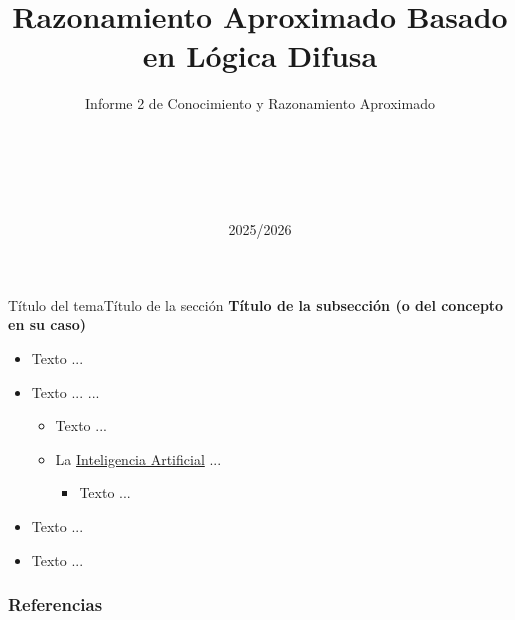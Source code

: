 \documentclass[10pt, envcountsect, presentation, aspectratio=169]{beamer}
\title[Nombre]{Razonamiento Aproximado Basado en Lógica Difusa}
\subtitle{Informe 2 de Conocimiento y Razonamiento Aproximado} %
\author[E1. Apellidos1, E2. Apellidos2] %
{%
	\sc{Estudiante1 Apellidos1}\\  %
	\\
	\sc{Estudiante2 Apellidos 2}\\ %
	\\   %
}
\institute[DIIC]%
{
	\textit{Universidad de Murcia}
}
\date{2025/2026} %
\begin{document}
	



\begin{frame}[plain]
	\titlepage
\end{frame}



\begin{frame}{Título del tema}{Título de la sección}
\textbf{Título de la subsección (o del concepto en su caso)}
	\begin{itemize}
	\item Texto ...
	\item Texto ... \citep{Russell2020} ...
		\begin{itemize}
		\normalsize %
		\item[--] Texto ...
		\item[--] La \href{https://es.wikipedia.org/wiki/Inteligencia_artificial}{Inteligencia Artificial} ...
			\begin{itemize}
			\normalsize %
			\item[$\bullet$] Texto ...
			\end{itemize}	
			\end{itemize} 
	\item Texto ...		
	\item Texto ...
	\end{itemize}
\end{frame}





\begin{frame} %
	\frametitle{Referencias}
	\footnotesize
	
		
\end{frame}    
		
\end{document}
